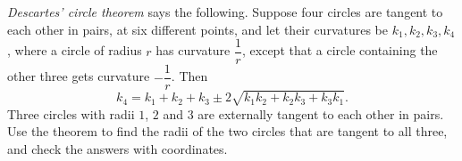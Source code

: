 \emph{Descartes' circle theorem} says the following. Suppose four circles are tangent to each other in pairs, at six different points, and let their curvatures be $k_1,k_2,k_3,k_4$, where a circle of radius $r$ has curvature $\dfrac1r$, except that a circle containing the other three gets curvature $-\dfrac1r$. Then
\[k_4=k_1+k_2+k_3\pm2\sqrt{k_1k_2+k_2k_3+k_3k_1}.\]
Three circles with radii $1$, $2$ and $3$ are externally tangent to each other in pairs. Use the theorem to find the radii of the two circles that are tangent to all three, and check the answers with coordinates.
